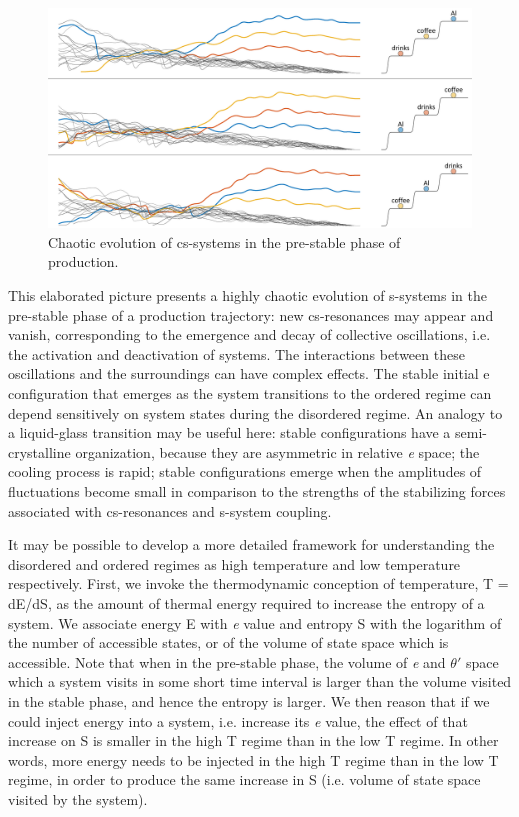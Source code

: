    
\begin{figure}
\includegraphics[width=\textwidth]{figures/Tilsen-img77.png}
\caption{Chaotic evolution of cs-systems in the pre-stable phase of production.}
\label{fig:4:27}
\end{figure}
 

  This elaborated picture presents a highly chaotic evolution of s-systems in the pre-stable phase of a production trajectory: new cs-resonances may appear and vanish, corresponding to the emergence and decay of collective oscillations, i.e. the activation and deactivation of systems. The interactions between these oscillations and the surroundings can have complex effects. The stable initial e configuration that emerges as the system transitions to the ordered regime can depend sensitively on system states during the disordered regime. An analogy to a liquid-glass transition may be useful here: stable configurations have a semi-crystalline organization, because they are asymmetric in relative \textit{e} space; the cooling process is rapid; stable configurations emerge when the amplitudes of fluctuations become small in comparison to the strengths of the stabilizing forces associated with cs-resonances and s-system coupling.

  It may be possible to develop a more detailed framework for understanding the disordered and ordered regimes as high temperature and low temperature respectively. First, we invoke the thermodynamic conception of temperature, T = dE/dS, as the amount of thermal energy required to increase the entropy of a system. We associate energy E with \textit{e} value and entropy S with the logarithm of the number of accessible states, or of the volume of state space which is accessible. Note that when in the pre-stable phase, the volume of \textit{e} and $\theta ′$ space which a system visits in some short time interval is larger than the volume visited in the stable phase, and hence the entropy is larger. We then reason that if we could inject energy into a system, i.e. increase its \textit{e} value, the effect of that increase on S is smaller in the high T regime than in the low T regime. In other words, more energy needs to be injected in the high T regime than in the low T regime, in order to produce the same increase in S (i.e. volume of state space visited by the system).

